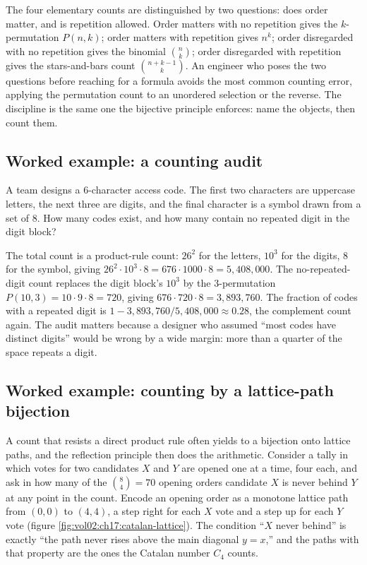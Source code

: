 \begin{archetype}
The four elementary counts are distinguished by two questions: does
order matter, and is repetition allowed. Order matters with no
repetition gives the $k$-permutation $P(n, k)$; order matters with
repetition gives $n^{k}$; order disregarded with no repetition gives
the binomial $\binom{n}{k}$; order disregarded with repetition gives
the stars-and-bars count $\binom{n + k - 1}{k}$. An engineer who
poses the two questions before reaching for a formula avoids the
most common counting error, applying the permutation count to an
unordered selection or the reverse. The discipline is the same one
the bijective principle enforces: name the objects, then count them.
\end{archetype}

\subsection{Worked example: a counting audit}

A team designs a $6$-character access code. The first two characters
are uppercase letters, the next three are digits, and the final
character is a symbol drawn from a set of $8$. How many codes exist,
and how many contain no repeated digit in the digit block?

The total count is a product-rule count: $26^{2}$ for the letters,
$10^{3}$ for the digits, $8$ for the symbol, giving $26^{2} \cdot
10^{3} \cdot 8 = 676 \cdot 1000 \cdot 8 = 5{,}408{,}000$. The
no-repeated-digit count replaces the digit block's $10^{3}$ by the
$3$-permutation $P(10, 3) = 10 \cdot 9 \cdot 8 = 720$, giving $676
\cdot 720 \cdot 8 = 3{,}893{,}760$. The fraction of codes with a
repeated digit is $1 - 3{,}893{,}760 / 5{,}408{,}000 \approx 0.28$,
the complement count again. The audit matters because a designer
who assumed ``most codes have distinct digits'' would be wrong by a
wide margin: more than a quarter of the space repeats a digit.

\subsection{Worked example: counting by a lattice-path bijection}

A count that resists a direct product rule often yields to a
bijection onto lattice paths, and the reflection principle then does
the arithmetic. Consider a tally in which votes for two candidates
$X$ and $Y$ are opened one at a time, four each, and ask in how many
of the $\binom{8}{4} = 70$ opening orders candidate $X$ is never
behind $Y$ at any point in the count. Encode an opening order as a
monotone lattice path from $(0, 0)$ to $(4, 4)$, a step right for
each $X$ vote and a step up for each $Y$ vote (figure
\ref{fig:vol02:ch17:catalan-lattice}). The condition ``$X$ never
behind'' is exactly ``the path never rises above the main diagonal
$y = x$,'' and the paths with that property are the ones the Catalan
number $C_{4}$ counts.

